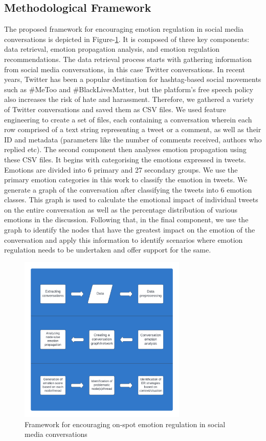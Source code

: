 \documentclass[acmtog]{acmart}
\begin{document}
\subsection{Methodological Framework}
The proposed framework for encouraging emotion regulation in social media conversations is depicted in Figure-\ref{fig:Framework}. It is composed of three key components: data retrieval, emotion propagation analysis, and emotion regulation recommendations. The data retrieval process starts with gathering information from social media conversations, in this case Twitter conversations. In recent years, Twitter has been a popular destination for hashtag-based social movements such as \#MeToo and \#BlackLivesMatter, but the platform's free speech policy also increases the risk of hate and harassment. Therefore, we gathered a variety of Twitter conversations and saved them as CSV files. We used feature engineering to create a set of files, each containing a conversation wherein each row comprised of a text string representing a tweet or a comment, as well as their ID and metadata (parameters like the number of comments received, authors who replied etc). The second component then analyses emotion propagation using these CSV files. It begins with categorising the emotions expressed in tweets. Emotions are divided into 6 primary and 27 secondary groups. We use the primary emotion categories in this work to classify the emotion in tweets. We generate a graph of the conversation after classifying the tweets into 6 emotion classes. This graph is used to calculate the emotional impact of individual tweets on the entire conversation as well as the percentage distribution of various emotions in the discussion. Following that, in the final component, we use the graph to identify the nodes that have the greatest impact on the emotion of the conversation and apply this information to identify scenarios where emotion regulation needs to be undertaken and offer support for the same.
\begin{figure}[h]
  
    \centering
    \includegraphics[width=8cm,height=8cm,keepaspectratio]{framework.pdf}
  \caption{Framework for encouraging on-spot emotion regulation in social media conversations}
  \label{fig:Framework}
  \end{figure}  
\end{document}
